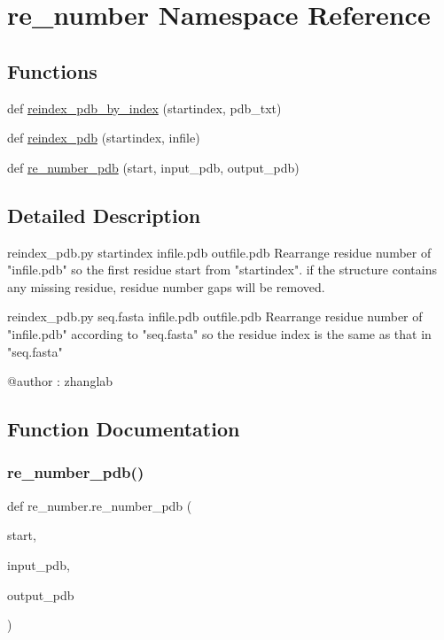 \hypertarget{namespacere__number}{}\section{re\+\_\+number Namespace Reference}
\label{namespacere__number}
\subsection*{Functions}
\begin{DoxyCompactItemize}
\item 
def \hyperlink{namespacere__number_ad7814641c4d9c9eb46a7aac1d4bdbc91}{reindex\+\_\+pdb\+\_\+by\+\_\+index} (startindex, pdb\+\_\+txt)
\item 
def \hyperlink{namespacere__number_a6245d598e99bf633464ce7c89f6a1567}{reindex\+\_\+pdb} (startindex, infile)
\item 
def \hyperlink{namespacere__number_acc6fc77a2a86fcbee1b04b25d41f2178}{re\+\_\+number\+\_\+pdb} (start, input\+\_\+pdb, output\+\_\+pdb)
\end{DoxyCompactItemize}


\subsection{Detailed Description}
\begin{DoxyVerb}reindex_pdb.py startindex infile.pdb outfile.pdb
    Rearrange residue number of "infile.pdb" so the first residue start from
    "startindex". if the structure contains any missing residue, residue
    number gaps will be removed.

reindex_pdb.py seq.fasta  infile.pdb outfile.pdb
    Rearrange residue number of "infile.pdb" according to "seq.fasta" so the
    residue index is the same as that in "seq.fasta"

@author : zhanglab
\end{DoxyVerb}
 

\subsection{Function Documentation}
\mbox{\label{namespacere__number_acc6fc77a2a86fcbee1b04b25d41f2178}} 
\subsubsection{\texorpdfstring{re\+\_\+number\+\_\+pdb()}{re\_number\_pdb()}}
{\footnotesize\ttfamily def re\+\_\+number.\+re\+\_\+number\+\_\+pdb (\begin{DoxyParamCaption}\item[{}]{start,  }\item[{}]{input\+\_\+pdb,  }\item[{}]{output\+\_\+pdb }\end{DoxyParamCaption})}

